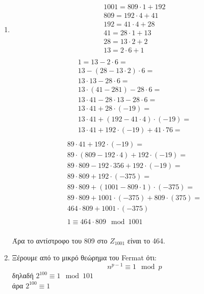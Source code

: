 \documentclass[12pt]{article}
\numberwithin{equation}{section}
\begin{document}
{{\begin{enumerate}[label=(\roman*)]
				Για τους αριθμούς Bezout έχουμε: \\
				202 = 5050 - 4848 = 5050 - (126048 - 24 $\cdot$ 5050) = \textbf{-1} $\cdot$ 126048 + \textbf{25} $\cdot$ 5050 \\
				Άρα, οι αριθμοί Bezout είναι οι: \textbf{-1}, \textbf{25}\\
				$Z_{1001} , x=809$
				\item \begin{gather*} 
				1001 = 809 \cdot 1 + 192\\
				809 = 192 \cdot 4 + 41\\
				192 = 41 \cdot 4 + 28\\
				41 = 28 \cdot 1 + 13\\
				28 = 13 \cdot 2 + 2\\
				13 = 2 \cdot 6 + 1\\
				\end{gather*}
				\begin{gather*}
				1 = 13 - 2 \cdot 6 = \\
				13 - (28 - 13 \cdot 2) \cdot 6 =\\
				13 \cdot 13 - 28 \cdot 6 =\\
				13 \cdot (41 - 281) - 28 \cdot 6=\\
				13 \cdot 41 - 28 \cdot 13 - 28 \cdot 6=\\
				13 \cdot 41 + 28 \cdot  (-19)=\\
				13 \cdot 41 + (192 - 41 \cdot 4) \cdot (-19)=\\
				13 \cdot 41 + 192 \cdot (-19) + 41 \cdot 76=\\
				\end{gather*}
				\begin{gather*}
				89 \cdot 41 + 192 \cdot (-19) =\\
				89 \cdot (809 - 192 \cdot 4) + 192 \cdot (-19)=\\
				89 \cdot 809 - 192 \cdot 356 + 192 \cdot (-19)=\\
				89 \cdot 809 + 192 \cdot (-375)=\\
				89 \cdot 809 + (1001 - 809 \cdot 1) \cdot (-375) =\\
				89 \cdot 809 + 1001 \cdot (-375) + 809 \cdot (375)=\\
				464 \cdot 809 + 1001 \cdot (-375)\\\\
				1 \equiv 464 \cdot 809 \mod 1001\\
				\end{gather*}
				
				Άρα το αντίστροφο του 809 στο $Ζ_{1001}$ είναι το 464.
				
				\item Ξέρουμε από το μικρό θεώρημα του Fermat ότι:
				$$n^{p-1} \equiv 1 \mod p$$
				δηλαδή $2^{100} \equiv 1 \mod 101$ \\
				άρα $2^{100} \equiv 1$
			\end{enumerate}			
	}}
\end{document}
